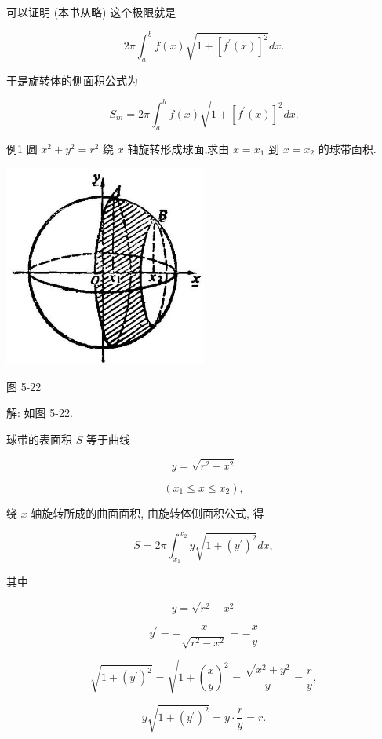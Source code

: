 \documentclass[10pt]{article}
\begin{document}
可以证明 (本书从略) 这个极限就是

\[
{2\pi }{\int }_{a}^{b}f\left( x\right) \sqrt{1 + {\left\lbrack {f}^{\prime }\left( x\right) \right\rbrack }^{2}}{dx}.
\]

于是旋转体的侧面积公式为

\[
{S}_{m} = {2\pi }{\int }_{a}^{b}f\left( x\right) \sqrt{1 + {\left\lbrack {f}^{\prime }\left( x\right) \right\rbrack }^{2}}{dx}.
\]

例1 圆 \({x}^{2} + {y}^{2} = {r}^{2}\) 绕 \(x\) 轴旋转形成球面,求由 \(x = {x}_{1}\) 到 \(x = {x}_{2}\) 的球带面积.

\begin{center}
\includegraphics[max width=0.5\textwidth]{images/01912c18-5c3f-733d-b775-749ba9897a9d_245_758349.jpg}
\end{center}

图 5-22

解: 如图 5-22.

球带的表面积 \(S\) 等于曲线

\[
y = \sqrt{{r}^{2} - {x}^{2}}
\]

\[
\left( {{x}_{1} \leq x \leq {x}_{2}}\right) ,
\]

绕 \(x\) 轴旋转所成的曲面面积, 由旋转体侧面积公式, 得

\[
S = {2\pi }{\int }_{{x}_{1}}^{{x}_{2}}y\sqrt{1 + {\left( {y}^{\prime }\right) }^{2}}{dx},
\]

其中

\[
y = \sqrt{{r}^{2} - {x}^{2}}
\]

\[
{y}^{\prime } = - \frac{x}{\sqrt{{r}^{2} - {x}^{2}}} = - \frac{x}{y}
\]

\[
\sqrt{1 + {\left( {y}^{\prime }\right) }^{2}} = \sqrt{1 + {\left( \frac{x}{y}\right) }^{2}} = \frac{\sqrt{{x}^{2} + {y}^{2}}}{y} = \frac{r}{y},
\]

\[
y\sqrt{1 + {\left( {y}^{\prime }\right) }^{2}} = y \cdot \frac{r}{y} = r.
\]
\end{document}
